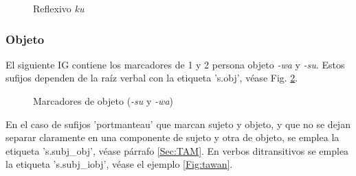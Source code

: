 \documentclass[a4paper,11pt,DIV12]{scrartcl}
\begin{document}
\begin{figure}
\begin{center}
\caption{Reflexivo {\em ku}}\label{Fig:ku}
\end{center}
\end{figure}


\subsubsection{Objeto}\label{Sec:objeto}
El siguiente IG contiene los marcadores de 1{\textordfeminine} y 2{\textordfeminine} persona objeto {\em -wa} y {\em -su}. Estos sufijos dependen de la ra\'iz verbal con la etiqueta 's.obj', v\'ease Fig. \ref{Fig:su_wa}.
% 
\begin{figure}
\begin{center}
 \caption{Marcadores de objeto ({\em -su} y {\em -wa})}\label{Fig:su_wa}
\end{center}
\end{figure}


En el caso de sufijos 'portmanteau' que marcan sujeto y objeto, y que no se dejan separar claramente en una componente de sujeto y otra de objeto, se emplea la etiqueta 's.subj\_obj', v\'ease p\'arrafo \ref{Sec:TAM}.
En verbos ditransitivos se emplea la etiqueta 's.subj\_iobj', v\'ease el ejemplo \ref{Fig:tawan}.
\end{document}
